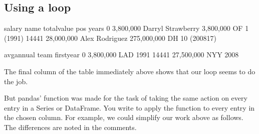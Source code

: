 \documentclass[letterpaper,10pt,english]{jupyterBook}
\begin{document}
\subsection{Using a loop}
\label{\detokenize{chapter-11-processing-rows:using-a-loop}}
\begin{sphinxVerbatim}[commandchars=\\\{\}]
  \PYG{p}{[} \PYG{p}{]}
   \PYG{p}{[}\PYG{p}{]}
     \PYG{p}{[}\PYG{p}{]}   
          \PYG{p}{[}\PYG{p}{]}  
     
          \PYG{p}{[}\PYG{p}{]}  
\PYG{p}{[}\PYG{p}{]}  
        
\PYG{p}{[}\PYG{p}{[}\PYG{p}{]}\PYG{p}{]} 
\end{sphinxVerbatim}

\begin{sphinxVerbatim}[commandchars=\\\{\}]
             salary               name    total\PYGZus{}value pos         years  \PYGZbs{}
0       \PYGZdl{} 3,800,000  Darryl Strawberry    \PYGZdl{} 3,800,000  OF      1 (1991)   
14441  \PYGZdl{} 28,000,000     Alex Rodriguez  \PYGZdl{} 275,000,000  DH  10 (2008\PYGZhy{}17)   

         avg\PYGZus{}annual team  first\PYGZus{}year  
0       \PYGZdl{} 3,800,000  LAD        1991  
14441  \PYGZdl{} 27,500,000  NYY        2008  
\end{sphinxVerbatim}

\sphinxAtStartPar
The final column of the table immediately above shows that our loop seems to do the job.

\sphinxAtStartPar
But pandas’  function was made for the task of taking the same action on every entry in a Series or DataFrame.  You write  to apply the function  to every entry in the chosen column.  For example, we could simplify our work above as follows.  The differences are noted in the comments.
\end{document}
